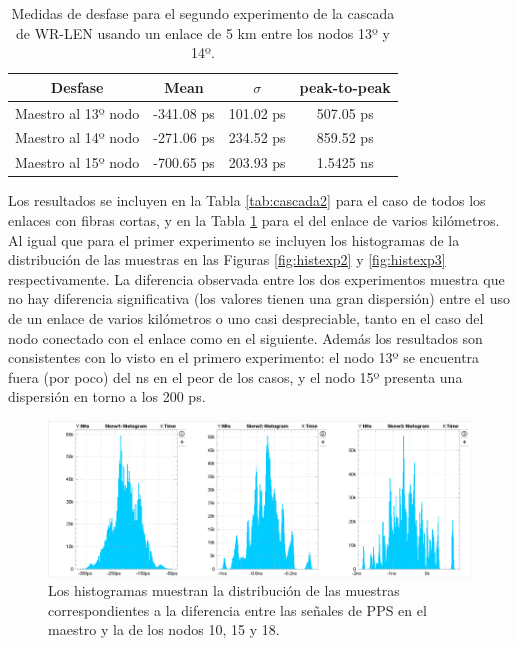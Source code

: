 \begin{table}
	\renewcommand{\arraystretch}{1.3}
	\caption{Medidas de desfase para el segundo experimento de la cascada de 
		WR-LEN usando un enlace de 5 km entre los nodos 13º y 14º.}
	\label{tab:cascada3}
	\centering
	\begin{tabular}{|c||c||c||c|}
		\hline
		Desfase & Mean & $\sigma$ & peak-to-peak \\
		\hline
		Maestro al 13º nodo & -341.08 ps & 101.02 ps & 507.05 ps \\
		\hline
		Maestro al 14º nodo & -271.06 ps & 234.52 ps & 859.52 ps \\
		\hline
		Maestro al 15º nodo & -700.65 ps & 203.93 ps & 1.5425 ns \\
		\hline
	\end{tabular}
\end{table}

Los resultados se incluyen en la Tabla \ref{tab:cascada2} para el caso de todos 
los enlaces con fibras cortas, y en la Tabla \ref{tab:cascada3} para el del 
enlace de varios kilómetros. Al igual que para el primer experimento se 
incluyen los histogramas de la distribución de las muestras en las Figuras 
\ref{fig:histexp2} y \ref{fig:histexp3} respectivamente. La diferencia 
observada entre los dos experimentos muestra que no hay diferencia 
significativa (los valores tienen una gran dispersión) entre el uso de un 
enlace de varios kilómetros o uno casi despreciable, tanto en el caso del nodo 
conectado con el enlace como en el siguiente. Además los resultados son 
consistentes con lo visto en el primero experimento: el nodo 13º se encuentra 
fuera (por poco) del ns en el peor de los casos, y el nodo 15º presenta una 
dispersión en torno a los 200 ps.

\begin{figure}
	\centering
	\includegraphics[width=0.7\linewidth]{imagenes/hist_exp1}
	\caption[Histograma para cadena de 18 WR-LEN]{Los histogramas muestran la 
	distribución de las muestras correspondientes a la diferencia entre las 
	señales de PPS en el maestro y la de los nodos 10, 15 y 18.}
	\label{fig:histexp1}
\end{figure}

